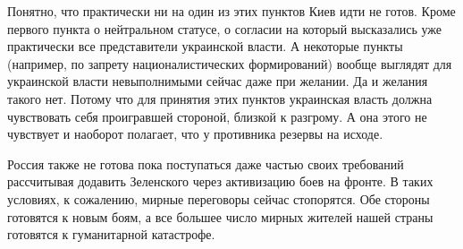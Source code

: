 Понятно, что практически ни на один из этих пунктов Киев идти не готов. Кроме
первого пункта о нейтральном статусе, о согласии на который высказались уже
практически все представители украинской власти. А некоторые пункты (например,
по запрету националистических формирований) вообще выглядят для украинской
власти невыполнимыми сейчас даже при желании. Да и желания такого нет. Потому
что для принятия этих пунктов украинская власть должна чувствовать себя
проигравшей стороной, близкой к разгрому. А она этого не чувствует и наоборот
полагает, что у противника резервы на исходе.

Россия также не готова пока поступаться даже частью своих требований
рассчитывая додавить Зеленского через активизацию боев на фронте. В таких
условиях, к сожалению, мирные переговоры сейчас стопорятся. Обе стороны
готовятся к новым боям, а все большее число мирных жителей нашей страны
готовятся к гуманитарной катастрофе.


